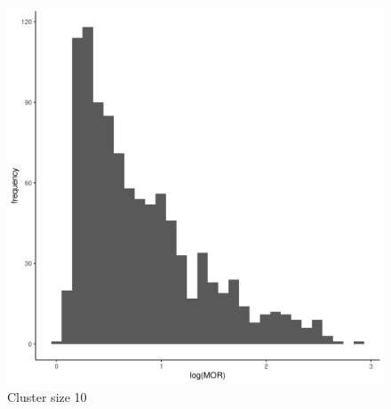 \documentclass[
  letterpaper,
  DIV=11,
  numbers=noendperiod,
  titlepage]{scrartcl}
\begin{document}
\begin{figure}
\begin{minipage}[t]{0.24\linewidth}
{{\includegraphics{../../plots/two-lvl-ran-slope/low-prev/hist_10_10_two_lvl_slp_low_prev_q3.png}

}

\caption{Cluster size 10}

}

\end{minipage}%
%
\begin{minipage}[t]{0.24\linewidth}

{\centering 

}
\end{minipage}
\end{figure}
\end{document}
